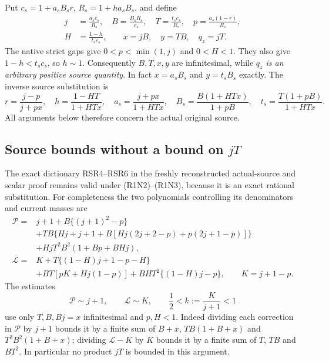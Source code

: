Put $c_s=1+a_sB_sr$, $R_s=1+ha_sB_s$, and define
\[
\begin{aligned}
 j&=\frac{a_sc_s}{R_s},\quad B=\frac{B_sR_s}{c_s},\quad
 T=\frac{t_sc_s}{R_s},\quad p=\frac{a_s(1-r)}{R_s},\\
 H&=\frac{1-h}{t_sc_s},\qquad x=jB,\quad y=TB,\quad q_z=jT.
\end{aligned}                                          \tag{R1N2}
\]
The native strict gaps give $0<p<\min(1,j)$ and $0<H<1$.
They also give $1-h<t_sc_s$, so $h\sim1$.
Consequently $B,T,x,y$ are infinitesimal, while
\emph{$q_z$ is an arbitrary positive source quantity}.
In fact $x=a_sB_s$ and $y=t_sB_s$ exactly.
The inverse source substitution is
\[
 r=\frac{j-p}{j+px},\quad h=\frac{1-HT}{1+HTx},\quad
 a_s=\frac{j+px}{1+HTx},\quad
 B_s=\frac{B(1+HTx)}{1+pB},\quad
 t_s=\frac{T(1+pB)}{1+HTx}.                             \tag{R1N3}
\]
All arguments below therefore concern the actual original source.

\subsection{Source bounds without a bound on \(jT\)}

The exact dictionary RSR4--RSR6 in the freshly reconstructed
actual-source and scalar proof remains valid under
(R1N2)--(R1N3), because it is an exact rational substitution.
For completeness the two polynomials controlling its denominators
and current masses are
\begin{align*}
 \mathcal P={}&j+1+B\{(j+1)^2-p\}\\
 &+TB\{Hj+j+1+B[Hj(2j+2-p)+p(2j+1-p)]\}\\
 &+HjT^2B^2(1+Bp+BHj),\\
 \mathcal L={}&K+T\{(1-H)j+1-p-H\}\\
 &+BT[pK+Hj(1-p)]+BHT^2\{(1-H)j-p\},
 \qquad K=j+1-p .
\end{align*}
The estimates
\[
 \mathcal P\sim j+1,\qquad \mathcal L\sim K,\qquad
 \frac12<k:=\frac K{j+1}<1                               \tag{R1N4}
\]
use only $T,B,Bj=x$ infinitesimal and $p,H<1$.
Indeed dividing each correction in $\mathcal P$ by $j+1$ bounds it
by a finite sum of $B+x$, $TB(1+B+x)$ and
$T^2B^2(1+B+x)$; dividing $\mathcal L-K$ by $K$ bounds it
by a finite sum of $T$, $TB$ and $BT^2$.
In particular no product $jT$ is bounded in this argument.

